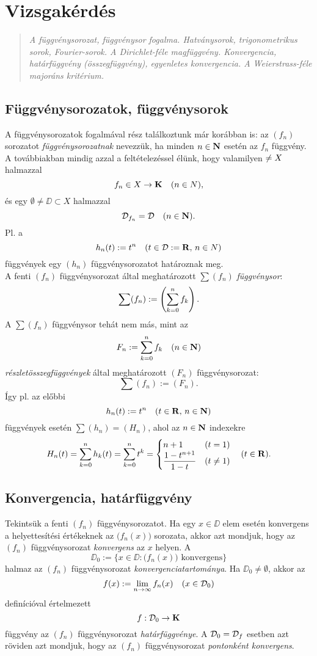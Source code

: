 \newpage
\section{Vizsgakérdés}
\begin{quote}
	\textit{A függvénysorozat, függvénysor fogalma. Hatványsorok, trigonometrikus sorok, Fourier-sorok. A Dirichlet-féle magfüggvény. Konvergencia, határfüggvény (összegfüggvény), egyenletes konvergencia. A Weierstrass-féle majoráns kritérium.}
\end{quote}

\subsection{Függvénysorozatok, függvénysorok}

A függvénysorozatok fogalmával rész találkoztunk már korábban is: az $(f_n)$ sorozatot \textit{függvénysorozatnak} nevezzük, ha minden $n \in \mathbf{N}$ esetén az $f_n$ függvény. A továbbiakban mindig azzal a feltételezéssel élünk, hogy valamilyen $\empty \neq X$ halmazzal
\[
	f_n \in X \to \mathbf{K} \quad (n \in N),
\]
és egy $\emptyset \neq \DD \subset X$ halmazzal
\[
	\mathcal{D}_{f_n} = \mathcal{D} \quad (n \in \mathbf{N}).
\]
Pl. a
\[
	h_n(t) := t^n \quad (t \in \mathcal{D} := \mathbf{R}, \, n \in N)
\]
függvények egy $(h_n)$ függvénysorozatot határoznak meg.\\

A fenti $(f_n)$ függvénysorozat által meghatározott $\sum(f_n)$ \textit{függvénysor}:
\[
	\sum(f_n) := \left( \sum_{k=0}^n f_k \right).
\]
A $\sum(f_n)$ függvénysor tehát nem más, mint az
\[
	F_n := \sum_{k=0}^n f_k \quad (n \in \mathbf{N})
\]
\textit{részletösszegfüggvények} által meghatározott $(F_n)$ függvénysorozat:
\[
	\sum(f_n) := (F_n).
\]
Így pl. az előbbi
\[
	h_n(t) := t^n \quad (t \in \mathbf{R}, \, n \in \mathbf{N})
\]
függvények esetén $\sum(h_n) = (H_n)$, ahol az $n \in \mathbf{N}$ indexekre
\[
	H_n(t) = \sum_{k=0}^n h_k(t) = \sum_{k=0}^n t^k = \begin{cases}
		n + 1 & (t = 1) \\
		\displaystyle \frac{1-t^{n+1}}{1-t} & (t \neq 1)
	\end{cases} \quad (t \in \mathbf{R}).
\]

\subsection{Konvergencia, határfüggvény}

Tekintsük a fenti $(f_n)$ függvénysorozatot. Ha egy $x \in \DD$ elem esetén konvergens a helyettesítési értékeknek az $\big(f_n(x)\big)$ sorozata, akkor azt mondjuk, hogy az $(f_n)$ függvénysorozat \textit{konvergens} az $x$ helyen. A
\[
	\DD_0 := \big\{ x \in \DD : \big(f_n(x)\big) \text{ konvergens} \big\}
\]
halmaz az $(f_n)$ függvénysorozat \textit{konvergenciatartománya}. Ha $\DD_0 \neq \emptyset$, akkor az
\[
	f(x) := \lim_{n \to \infty} f_n(x) \quad (x \in \mathcal{D}_0)
\]
definícióval értelmezett
\[
	f : \mathcal{D}_0 \to \mathbf{K}
\]
függvény az $(f_n)$ függvénysorozat \textit{határfüggvénye}. A $\mathcal{D}_0 = \mathcal{D}_f$ esetben azt röviden azt mondjuk, hogy az $(f_n)$ függvénysorozat \textit{pontonként konvergens}.\\

